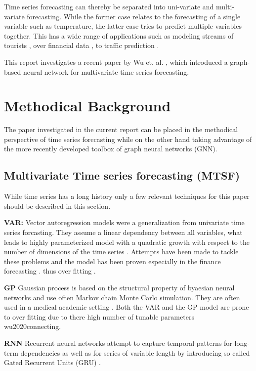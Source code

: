 \documentclass[letterpaper,twocolumn,11pt]{article}
\begin{document}
   Time series forecasting can thereby be separated into uni-variate and multi-variate forecasting. While the former case relates to the forecasting of a single variable such as temperature, the latter case tries to predict multiple variables together. This has a wide range of applications such as modeling streams of tourists \cite{cankurt2016tourism},  over financial data \cite{torres2018applying}, to traffic prediction \cite{yin2016forecasting}.

This report investigates a recent paper by Wu et. al. \cite{wu2020connecting}, which introduced a graph-based neural network for multivariate time series forecasting.

    \section{Methodical Background}
    The paper investigated in the current report can be placed in the methodical perspective of time series forecasting while on the other hand  taking advantage of the more recently developed toolbox of graph neural networks (GNN).

    \subsection{Multivariate Time series forecasting (MTSF)}
    While time series has a long history only a few relevant techniques for this paper should be described in this section.

    \textbf{VAR:} Vector autoregression models were a generalization from univariate time series forcasting. They assume a linear dependency between all variables, what leads to highly parameterized model with a quadratic growth with respect to the number of dimensions of the time series \cite{lutkepohl2013vector}. Attempts have been made to tackle these problems and the model has been proven especially in the finance forecasting .
     thus over fitting \cite{lutkepohl2009econometric}.

    \textbf{GP} Gaussian process is based on the structural property of byaesian neural networks and use often Markov chain Monte Carlo simulation. They are often used in a medical academic setting \cite{CHEN200759}. Both the VAR and the GP model are prone to over fitting due to there high number of tunable parameters {wu2020connecting}.

    \textbf{RNN} Recurrent neural networks attempt to capture temporal patterns for long-term dependencies as well as for series of variable length by introducing so called Gated Recurrent Units (GRU) \cite{che2018recurrent}.
\end{document}
